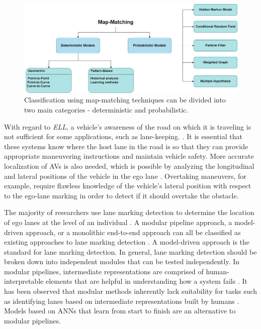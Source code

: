 \documentclass[a4paper,12pt]{article}
\begin{document}
\begin{figure}[H]
  \centering
  \includegraphics*[width=1.1\columnwidth]{img/Map-Matching}
  \caption{Classification using map-matching techniques can be divided into two main categories - deterministic and probabilistic.}   
  \label{fig:Map-Matching}
\end{figure}


\hspace{5mm} With regard to \textit E\textit L\textit L, a vehicle's awareness of the road on which it is traveling is not sufficient for some applications, such as lane-keeping. \cite{article32}. It is essential that these systems know where the host lane in the road is so that they can provide appropriate maneuvering instructions and maintain vehicle safety. More accurate localization of AVs is also needed, which is possible by analyzing the longitudinal and lateral positions of the vehicle in the ego lane \cite{article32}. Overtaking maneuvers, for example, require flawless knowledge of the vehicle's lateral position with respect to the ego-lane marking in order to detect if it should overtake the obstacle.


\hspace{5mm} The majority of researchers use lane marking detection to determine the location of ego lanes at the level of an individual \cite{article32}. A modular pipeline approach, a model-driven approach, or a monolithic end-to-end approach can all be classified as existing approaches to lane marking detection \cite{article32}. A model-driven approach is the standard for lane marking detection. In general, lane marking detection should be broken down into independent modules that can be tested independently. In modular pipelines, intermediate representations are comprised of human-interpretable elements that are helpful in understanding how a system fails \cite{article32}. It has been observed that modular methods inherently lack suitability for tasks such as identifying lanes based on intermediate representations built by humans \cite{article32}. Models based on ANNs that learn from start to finish are an alternative to modular pipelines.
\end{document}
